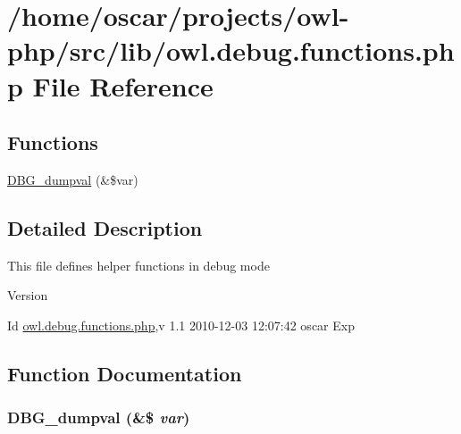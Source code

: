 \section{/home/oscar/projects/owl-\/php/src/lib/owl.debug.functions.php File Reference}
\label{owl_8debug_8functions_8php}
\subsection*{Functions}
\begin{DoxyCompactItemize}
\item 
\hyperlink{owl_8debug_8functions_8php_a65a2d146de0c2b3a89eb4c118a88905f}{DBG\_\-dumpval} (\&\$var)
\end{DoxyCompactItemize}


\subsection{Detailed Description}
This file defines helper functions in debug mode \begin{DoxyVersion}{Version}

\end{DoxyVersion}
\begin{DoxyParagraph}{Id}
\hyperlink{owl_8debug_8functions_8php}{owl.debug.functions.php},v 1.1 2010-\/12-\/03 12:07:42 oscar Exp 
\end{DoxyParagraph}


\subsection{Function Documentation}
\subsubsection[{DBG\_\-dumpval}]{\setlength{\rightskip}{0pt plus 5cm}DBG\_\-dumpval (\&\$ {\em var})}\label{owl_8debug_8functions_8php_a65a2d146de0c2b3a89eb4c118a88905f}
